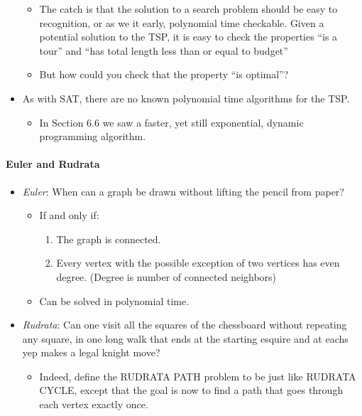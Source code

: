 \documentclass[a4paper,11pt]{article}
\begin{document}
\begin{itemize}
  \begin{itemize}
  \itemsep1pt\parskip0pt
  \item
    The catch is that the solution to a search problem should be easy to
    recognition, or as we it early, polynomial time checkable. Given a
    potential solution to the TSP, it is easy to check the properties
    ``is a tour'' and ``has total length less than or equal to budget''
  \item
    But how could you check that the property ``is optimal''?
  \end{itemize}
\item
  As with SAT, there are no known polynomial time algorithms for the
  TSP.

  \begin{itemize}
  \itemsep1pt\parskip0pt
  \item
    In Section 6.6 we saw a faster, yet still exponential, dynamic
    programming algorithm.
  \end{itemize}
\end{itemize}

\paragraph{Euler and Rudrata}\label{euler-and-rudrata}

\begin{itemize}
\itemsep1pt\parskip0pt
\item
  \emph{Euler}: When can a graph be drawn without lifting the pencil
  from paper?

  \begin{itemize}
  \itemsep1pt\parskip0pt
  \item
    If and only if:

    \begin{enumerate}
    \def\labelenumi{\arabic{enumi}.}
    \itemsep1pt\parskip0pt
    \item
      The graph is connected.
    \item
      Every vertex with the possible exception of two vertices has even
      degree. (Degree is number of connected neighbors)
    \end{enumerate}
  \item
    Can be solved in polynomial time.
  \end{itemize}
\item
  \emph{Rudrata}: Can one visit all the squares of the chessboard
  without repeating any square, in one long walk that ends at the
  starting esquire and at eachs yep makes a legal knight move?

  \begin{itemize}
  \itemsep1pt\parskip0pt
  \item
    Indeed, define the RUDRATA PATH problem to be just like RUDRATA
    CYCLE, except that the goal is now to find a path that goes through
    each vertex exactly once.
  \end{itemize}
\end{itemize}
\end{document}
